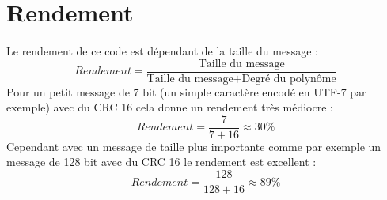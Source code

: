     \section{Rendement}

        \paragraph{}
Le rendement de ce code est dépendant de la taille du message :
\[  Rendement = \frac{\text{Taille du message}}{\text{Taille du message} + \text{Degré du polynôme}} \]
Pour un petit message de 7 bit (un simple caractère encodé en UTF-7 par exemple) avec du CRC 16 cela donne un rendement très médiocre :
\[  Rendement = \frac{7}{7 + 16} \approx 30\%  \]
Cependant avec un message de taille plus importante comme par exemple un message de 128 bit avec du CRC 16 le rendement est excellent :
\[  Rendement = \frac{128}{128 + 16} \approx 89\%  \]

